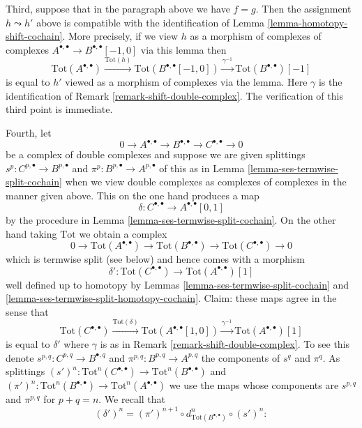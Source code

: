 \begin{remark}
\medskip\noindent
Third, suppose that in the paragraph above we have $f = g$.
Then the assignment $h \leadsto h'$ above is compatible with
the identification of Lemma \ref{lemma-homotopy-shift-cochain}.
More precisely, if we view $h$ as a morphism of complexes
of complexes $A^{\bullet, \bullet} \to B^{\bullet, \bullet}[-1, 0]$
via this lemma then
$$
\text{Tot}(A^{\bullet, \bullet})
\xrightarrow{\text{Tot}(h)}
\text{Tot}(B^{\bullet, \bullet}[-1, 0])
\xrightarrow{\gamma^{-1}}
\text{Tot}(B^{\bullet, \bullet})[-1]
$$
is equal to $h'$ viewed as a morphism of complexes via the lemma.
Here $\gamma$ is the identification of
Remark \ref{remark-shift-double-complex}.
The verification of this third point is immediate.

\medskip\noindent
Fourth, let
$$
0 \to A^{\bullet, \bullet} \to B^{\bullet, \bullet} \to
C^{\bullet, \bullet} \to 0
$$
be a complex of double complexes and suppose we are given splittings
$s^p : C^{p, \bullet} \to B^{p, \bullet}$ and
$\pi^p : B^{p, \bullet} \to A^{p, \bullet}$
of this as in Lemma \ref{lemma-ses-termwise-split-cochain}
when we view double complexes
as complexes of complexes in the manner given above.
This on the one hand produces a map
$$
\delta : C^{\bullet, \bullet} \longrightarrow A^{\bullet, \bullet}[0, 1]
$$
by the procedure in Lemma \ref{lemma-ses-termwise-split-cochain}.
On the other hand taking $\text{Tot}$ we obtain a complex
$$
0 \to \text{Tot}(A^{\bullet, \bullet}) \to
\text{Tot}(B^{\bullet, \bullet}) \to
\text{Tot}(C^{\bullet, \bullet}) \to 0
$$
which is termwise split (see below) and hence comes with a morphism
$$
\delta' :
\text{Tot}(C^{\bullet, \bullet})
\longrightarrow
\text{Tot}(A^{\bullet, \bullet})[1]
$$
well defined up to homotopy by Lemmas \ref{lemma-ses-termwise-split-cochain}
and \ref{lemma-ses-termwise-split-homotopy-cochain}. Claim:
these maps agree in the sense that
$$
\text{Tot}(C^{\bullet, \bullet})
\xrightarrow{\text{Tot}(\delta)}
\text{Tot}(A^{\bullet, \bullet}[1, 0]) \xrightarrow{\gamma^{-1}}
\text{Tot}(A^{\bullet, \bullet})[1]
$$
is equal to $\delta'$ where $\gamma$ is as in
Remark \ref{remark-shift-double-complex}. To see this denote
$s^{p, q} : C^{p, q} \to B^{\bullet, q}$ and
$\pi^{p, q} : B^{p, q} \to A^{p, q}$ the components of $s^q$ and $\pi^q$.
As splittings
$(s')^n : \text{Tot}^n(C^{\bullet, \bullet}) \to
\text{Tot}^n(B^{\bullet, \bullet})$
and
$(\pi')^n : \text{Tot}^n(B^{\bullet, \bullet}) \to
\text{Tot}^n(A^{\bullet, \bullet})$
we use the maps whose components are $s^{p, q}$ and $\pi^{p, q}$
for $p + q = n$. We recall that
$$
(\delta')^n =
(\pi')^{n + 1} \circ d_{\text{Tot}(B^{\bullet, \bullet})}^n \circ (s')^n :
$$
\end{remark}
